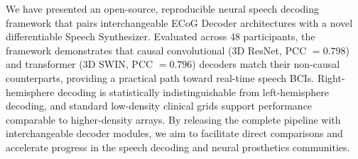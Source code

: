\documentclass[10pt]{article}
\begin{document}
We have presented an open-source, reproducible neural speech decoding framework that pairs interchangeable ECoG Decoder architectures with a novel differentiable Speech Synthesizer. Evaluated across 48 participants, the framework demonstrates that causal convolutional (3D ResNet, PCC $=0.798$) and transformer (3D SWIN, PCC $=0.796$) decoders match their non-causal counterparts, providing a practical path toward real-time speech BCIs. Right-hemisphere decoding is statistically indistinguishable from left-hemisphere decoding, and standard low-density clinical grids support performance comparable to higher-density arrays. By releasing the complete pipeline with interchangeable decoder modules, we aim to facilitate direct comparisons and accelerate progress in the speech decoding and neural prosthetics communities.



\end{document}
